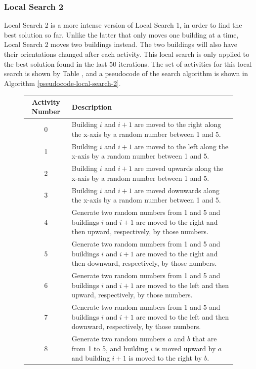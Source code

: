 \subsubsection{Local Search 2}
Local Search 2 is a more intense version of Local Search 1, in order to find the best solution so far. Unlike the latter that only moves one building at a time, Local Search 2 moves two buildings instead. The two buildings will also have their orientations changed after each activity. This local search is only applied to the best solution found in the last 50 iterations. The set of activities for this local search is shown by Table \cite{local-search-2-activities}, and a pseudocode of the search algorithm is shown in Algorithm \ref{pseudocode-local-search-2}.

\begin{figure}
	\begin{center}
		\begin{tabular}{| c | p{110mm} |}
			\hline
			Activity Number & Description \\
			\hline
			0  & Building $i$ and $i + 1$ are moved to the right along the x-axis by a random number between 1 and 5. \\
			1  & Building $i$ and $i + 1$ are moved to the left along the x-axis by a random number between 1 and 5. \\
			2  & Building $i$ and $i + 1$ are moved upwards along the x-axis by a random number between 1 and 5. \\
			3  & Building $i$ and $i + 1$ are moved downwards along the x-axis by a random number between 1 and 5. \\
			4  & Generate two random numbers from 1 and 5 and buildings $i$ and $i + 1$ are moved to the right and then upward, respectively, by those numbers. \\
			5  & Generate two random numbers from 1 and 5 and buildings $i$ and $i + 1$ are moved to the right and then downward, respectively, by those numbers. \\
			6  & Generate two random numbers from 1 and 5 and buildings $i$ and $i + 1$ are moved to the left and then upward, respectively, by those numbers. \\
			7  & Generate two random numbers from 1 and 5 and buildings $i$ and $i + 1$ are moved to the left and then downward, respectively, by those numbers. \\
			8  & Generate two random numbers $a$ and $b$ that are from 1 to 5, and building $i$ is moved upward by $a$ and building $i + 1$ is moved to the right by $b$. \\

\end{tabular}
\end{center}
\end{figure}
